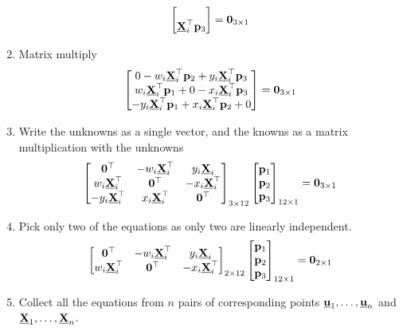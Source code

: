 \documentclass{article}
\begin{document}
\begin{enumerate}
\[\begin{bmatrix}
          \\
          \underline{\mathbf{X}}_i^\top\mathbf{p}_3
        \end{bmatrix} = \mathbf{0}_{3 \times 1}
        \]
      \item Matrix multiply
        \[
          \begin{bmatrix}
            0 -w_i \underline{\mathbf{X}}_i^\top\mathbf{p}_2 + y_i \underline{\mathbf{X}}_i^\top\mathbf{p}_3 \\
            w_i \underline{\mathbf{X}}_i^\top\mathbf{p}_1 + 0  -x_i \underline{\mathbf{X}}_i^\top\mathbf{p}_3 \\
            -y_i \underline{\mathbf{X}}_i^\top\mathbf{p}_1 + x_i \underline{\mathbf{X}}_i^\top\mathbf{p}_2 + 0
          \end{bmatrix} = \mathbf{0}_{3 \times 1}
          \]
        \item Write the unknowns as a single vector, and the knowns as a matrix
          multiplication with the unknowns
          \[
            \begin{bmatrix}
              \mathbf{0}^\top & -w_i \underline{\mathbf{X}}_i^\top & y_i \underline{\mathbf{X}}_i \\
              w_i \underline{\mathbf{X}}_i^\top & \mathbf{0}^\top  & -x_i \underline{\mathbf{X}}_i^\top \\
              -y_i \underline{\mathbf{X}}_i^\top & x_i \underline{\mathbf{X}}_i^\top & \mathbf{0}^\top
              \end{bmatrix}_{3 \times 12}
              \begin{bmatrix}
                \mathbf{p}_1 \\
                \mathbf{p}_2 \\
                \mathbf{p}_3
                \end{bmatrix}_{12 \times 1}
                = \mathbf{0}_{3 \times 1}
            \]
     \item Pick only two of the equations as only two are linearly independent.
       \[
         \begin{bmatrix}
           \mathbf{0}^\top & -w_i \underline{\mathbf{X}}_i^\top & y_i \underline{\mathbf{X}}_i \\
           w_i \underline{\mathbf{X}}_i^\top & \mathbf{0}^\top  & -x_i \underline{\mathbf{X}}_i^\top
         \end{bmatrix}_{2 \times 12}
         \begin{bmatrix}
           \mathbf{p}_1 \\
           \mathbf{p}_2 \\
           \mathbf{p}_3
         \end{bmatrix}_{12 \times 1}
         = \mathbf{0}_{2 \times 1}
       \]
     \item Collect all the equations from $n$ pairs of corresponding points
       $\underline{\mathbf{u}}_1, \dots, \underline{\mathbf{u}}_n$ and $\underline{\mathbf{X}}_1, \dots, \underline{\mathbf{X}}_n$.

\end{enumerate}
\end{document}
